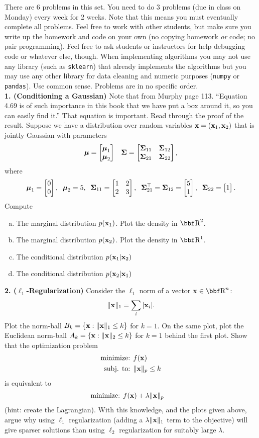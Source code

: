 \documentclass[12pt,letterpaper,fleqn]{hmcpset}
\begin{document}
There are 6 problems in this set. You need to do 3 problems (due in class on Monday)
every week for 2 weeks. Note that this means you must eventually complete all problems.
Feel free to work with other students, but make sure you write up the homework
and code on your own (no copying homework \textit{or} code; no pair programming).
Feel free to ask students or instructors for help debugging code or whatever else,
though.
When implementing algorithms you may not use any library (such as \texttt{sklearn})
that already implements the algorithms but you may use any other library for
data cleaning and numeric purposes (\texttt{numpy} or \texttt{pandas}). Use common
sense. Problems are in no specific order.\\[1em]

\textbf{1. (Conditioning a Gaussian)} Note that from Murphy page 113. ``Equation 4.69
is of such importance in this book that we have put a box around it, so you can easily
find it.'' That equation is important. Read through the proof of the result.
Suppose we have a distribution over random variables ${\bf x} = ({\bf x}_1, {\bf x}_2)$ that is
jointly Gaussian with parameters
\[
    \hbox{\boldmath$\mu$} = \begin{bmatrix} \hbox{\boldmath$\mu$}_1\\\hbox{\boldmath$\mu$}_2 \end{bmatrix}\;\;\; \hbox{\boldmath$\Sigma$} = \begin{bmatrix} \hbox{\boldmath$\Sigma$}_{11}&\hbox{\boldmath$\Sigma$}_{12}\\\hbox{\boldmath$\Sigma$}_{21}&\hbox{\boldmath$\Sigma$}_{22} \end{bmatrix},
\]
where
\[
    \hbox{\boldmath$\mu$}_1 = \begin{bmatrix} 0\\0 \end{bmatrix}, \;\; \hbox{\boldmath$\mu$}_2 = 5, \;\; \hbox{\boldmath$\Sigma$}_{11} = \begin{bmatrix} 1 & 2\\ 2 & 3 \end{bmatrix}, \;\; \hbox{\boldmath$\Sigma$}_{21}^\top = \hbox{\boldmath$\Sigma$}_{12} = \begin{bmatrix} 5\\1 \end{bmatrix}, \;\; \hbox{\boldmath$\Sigma$}_{22} = \begin{bmatrix} 1 \end{bmatrix}.
\]
Compute
\begin{enumerate}[(a)]
    \item The marginal distribution $p({\bf x}_1)$. Plot the density in $\RR^2$.
    \item The marginal distribution $p({\bf x}_2)$. Plot the density in $\RR^1$.
    \item The conditional distribution $p({\bf x}_1 | {\bf x}_2)$
    \item The conditional distribution $p({\bf x}_2 | {\bf x}_1)$\\[1em]
\end{enumerate}

\textbf{2. ($\ell_1$-Regularization)} Consider the $\ell_1$ norm of a vector $\xx\in\RR^n$:
\[
    \|{\bf x}\|_1 = \sum_i |{\bf x}_i|.
\]
Plot the norm-ball $B_k = \{{\bf x} : \|{\bf x}\|_1 \leq k\}$ for $k=1$. On the same plot, plot
the Euclidean norm-ball $A_k = \{{\bf x} : \|{\bf x}\|_2 \leq k\}$ for $k=1$ behind the first plot.
Show that the optimization problem
\begin{align*}
    \text{minimize: } & f({\bf x})\\
    \text{subj. to: } & \|{\bf x}\|_p \leq k
\end{align*}
is equivalent to
\begin{align*}
    \text{minimize: } & f({\bf x}) + \lambda\|{\bf x}\|_p
\end{align*}
(hint: create the Lagrangian). With this knowledge, and the plots given above, argue why
using $\ell_1$ regularization (adding a $\lambda\|{\bf x}\|_1$ term to the objective) will give
sparser solutions than using $\ell_2$ regularization for suitably large $\lambda$.\\[1em]
\end{document}
